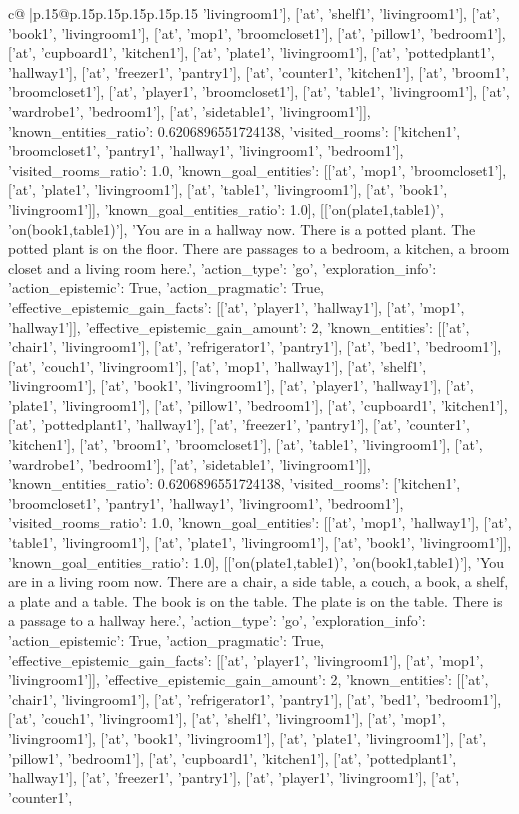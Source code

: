 \documentclass{article}
\begin{document}
{\begin{supertabular}{c@{$\;$}|p{.15\linewidth}@{}p{.15\linewidth}p{.15\linewidth}p{.15\linewidth}p{.15\linewidth}p{.15\linewidth}}
{{{'livingroom1'], ['at', 'shelf1', 'livingroom1'], ['at', 'book1', 'livingroom1'], ['at', 'mop1', 'broomcloset1'], ['at', 'pillow1', 'bedroom1'], ['at', 'cupboard1', 'kitchen1'], ['at', 'plate1', 'livingroom1'], ['at', 'pottedplant1', 'hallway1'], ['at', 'freezer1', 'pantry1'], ['at', 'counter1', 'kitchen1'], ['at', 'broom1', 'broomcloset1'], ['at', 'player1', 'broomcloset1'], ['at', 'table1', 'livingroom1'], ['at', 'wardrobe1', 'bedroom1'], ['at', 'sidetable1', 'livingroom1']], 'known_entities_ratio': 0.6206896551724138, 'visited_rooms': ['kitchen1', 'broomcloset1', 'pantry1', 'hallway1', 'livingroom1', 'bedroom1'], 'visited_rooms_ratio': 1.0, 'known_goal_entities': [['at', 'mop1', 'broomcloset1'], ['at', 'plate1', 'livingroom1'], ['at', 'table1', 'livingroom1'], ['at', 'book1', 'livingroom1']], 'known_goal_entities_ratio': 1.0}}], [['on(plate1,table1)', 'on(book1,table1)'], 'You are in a hallway now. There is a potted plant. The potted plant is on the floor. There are passages to a bedroom, a kitchen, a broom closet and a living room here.', {'action_type': 'go', 'exploration_info': {'action_epistemic': True, 'action_pragmatic': True, 'effective_epistemic_gain_facts': [['at', 'player1', 'hallway1'], ['at', 'mop1', 'hallway1']], 'effective_epistemic_gain_amount': 2, 'known_entities': [['at', 'chair1', 'livingroom1'], ['at', 'refrigerator1', 'pantry1'], ['at', 'bed1', 'bedroom1'], ['at', 'couch1', 'livingroom1'], ['at', 'mop1', 'hallway1'], ['at', 'shelf1', 'livingroom1'], ['at', 'book1', 'livingroom1'], ['at', 'player1', 'hallway1'], ['at', 'plate1', 'livingroom1'], ['at', 'pillow1', 'bedroom1'], ['at', 'cupboard1', 'kitchen1'], ['at', 'pottedplant1', 'hallway1'], ['at', 'freezer1', 'pantry1'], ['at', 'counter1', 'kitchen1'], ['at', 'broom1', 'broomcloset1'], ['at', 'table1', 'livingroom1'], ['at', 'wardrobe1', 'bedroom1'], ['at', 'sidetable1', 'livingroom1']], 'known_entities_ratio': 0.6206896551724138, 'visited_rooms': ['kitchen1', 'broomcloset1', 'pantry1', 'hallway1', 'livingroom1', 'bedroom1'], 'visited_rooms_ratio': 1.0, 'known_goal_entities': [['at', 'mop1', 'hallway1'], ['at', 'table1', 'livingroom1'], ['at', 'plate1', 'livingroom1'], ['at', 'book1', 'livingroom1']], 'known_goal_entities_ratio': 1.0}}], [['on(plate1,table1)', 'on(book1,table1)'], 'You are in a living room now. There are a chair, a side table, a couch, a book, a shelf, a plate and a table. The book is on the table. The plate is on the table. There is a passage to a hallway here.', {'action_type': 'go', 'exploration_info': {'action_epistemic': True, 'action_pragmatic': True, 'effective_epistemic_gain_facts': [['at', 'player1', 'livingroom1'], ['at', 'mop1', 'livingroom1']], 'effective_epistemic_gain_amount': 2, 'known_entities': [['at', 'chair1', 'livingroom1'], ['at', 'refrigerator1', 'pantry1'], ['at', 'bed1', 'bedroom1'], ['at', 'couch1', 'livingroom1'], ['at', 'shelf1', 'livingroom1'], ['at', 'mop1', 'livingroom1'], ['at', 'book1', 'livingroom1'], ['at', 'plate1', 'livingroom1'], ['at', 'pillow1', 'bedroom1'], ['at', 'cupboard1', 'kitchen1'], ['at', 'pottedplant1', 'hallway1'], ['at', 'freezer1', 'pantry1'], ['at', 'player1', 'livingroom1'], ['at', 'counter1', }}}
\end{supertabular}}
\end{document}
